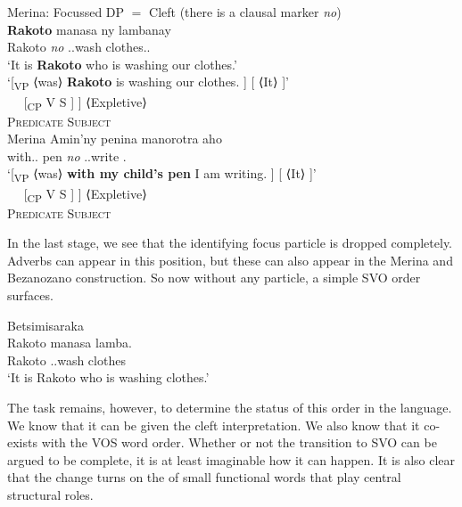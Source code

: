 \documentclass[output=paper]{langsci/langscibook}
\begin{document}
\ea Merina: Focussed DP $=$ Cleft (there is a clausal marker \emph{no})\\
       \ea
    \gll  \textbf{Rakoto}  manasa ny lambanay\\
    Rakoto \emph{no} \Prs.\At{}.wash \Det{} clothes.\Fpl.\Excl{}\\
    \glt `It is \textbf{Rakoto} who is washing our clothes.'  \\
    \glt `[\textsubscript{VP} ⟨was⟩ \textbf{Rakoto}  is washing our clothes. ] [ ⟨It⟩ ]' \\
    \ex
    \gll {$[$\textsubscript{VP} ⟨\Cop{⟩} DP} {~~} {[\textsubscript{CP}  V} {S ] ] ⟨Expletive⟩}\\
        {\textsc{Predicate}} {} {} \textsc{Subject}\\
    \z
\ex  Merina
    \ea
    \gll Amin'ny penina  manorotra aho\\
    with.\Gen{}.\Det{} pen \emph{no} \Prs.\At{}.write \Fsg{}.\Nom{}\\
    \glt `[\textsubscript{VP} ⟨was⟩ \textbf{with my child's pen}  I am writing. ] [ ⟨It⟩ ]' \\
    \ex
    \gll {$[$\textsubscript{VP} ⟨\Cop⟩ PP} {~~} {[\textsubscript{CP}  V} {S ] ] ⟨Expletive⟩}\\
    \textsc{Predicate} {} {} \textsc{Subject}\\
    \z
\z

In the last stage, we see that the identifying focus particle is dropped
completely.  Adverbs can appear in this position, but these  can also
appear in the Merina and Bezanozano construction.  So now without any particle,
a simple SVO order surfaces.\newpage

\ea Betsimisaraka\\
	\gll  Rakoto manasa lamba.\\
    Rakoto \Prs.\At{}.wash clothes\\
    \glt `It is Rakoto who is washing clothes.'
\z

The task remains, however, to determine the status of this order in the
language.  We know that it can be given the cleft interpretation.  We also know
that it co-exists with the VOS word order.  Whether or not the transition to
SVO can be argued to be complete, it is at least imaginable how it can happen.
It is also clear that the change turns on the  of small functional
words that play central structural roles.
\end{document}
